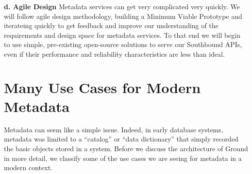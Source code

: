 \documentclass[10pt,letterpaper]{article}
\begin{document}
\vspace{0.5em}\noindent
\textbf{d. Agile Design}
Metadata services can get very complicated very quickly.  We will follow agile design methodology, building a Minimum Viable Prototype and iterateing quickly to get feedback and improve our understanding of the requirements and design space for metadata services.  To that end we will begin to use simple, pre-existing open-source solutions to serve our Southbound APIs, even if their performance and reliability characteristics are less than ideal.  



\section{Many Use Cases for Modern Metadata}
Metadata can seem like a simple issue.  Indeed, in early database systems, metadata was limited to a ``catalog'' or ``data dictionary'' that simply recorded the basic objects stored in a system. Before we discuss the architecture of Ground in more detail, we classify some of the use cases we are seeing for metadata in a modern context.
\end{document}
